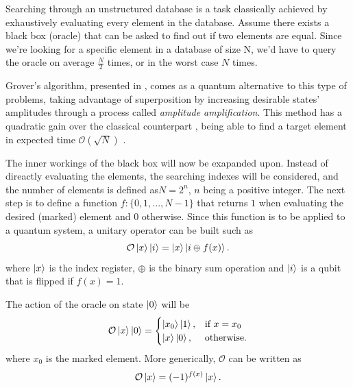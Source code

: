 \documentclass[../../dissertation.tex]{subfiles}
\begin{document}
Searching through an unstructured database is a task classically achieved by
exhaustively evaluating every element in the database. Assume there exists a
black box (oracle) that can be asked to find out if two elements are equal.
Since we're looking for a specific element in a database of size N, we'd have
to query the oracle on average $\frac{N}{2}$ times, or in the worst case $N$
times.\par 

Grover's algorithm, presented in \cite{grover1996}, comes as a
quantum alternative to this type of problems, taking advantage of superposition
by increasing desirable states' amplitudes through a process called
\textit{amplitude amplification}. This method has a quadratic gain over the
classical counterpart \cite{boyer1996}, being able to find a target element in
expected time $\mathcal{O}(\sqrt{N})$ .\par

The inner workings of the black box will now be exapanded upon. Instead of
direactly evaluating the elements, the searching indexes will be considered,
and the number of elements is defined as$N=2^{n}$, $n$ being a positive
integer. The next step is to define a function $f : \{0,1,...,N-1\}$ that
returns $1$ when evaluating the desired (marked) element and $0$ otherwise.
Since this function is to be applied to a quantum system, a unitary operator
can be built such as 
\begin{equation}
	\mathcal{O}\ket{x}\ket{i} = \ket{x}\ket{i\oplus f(x)} .
\end{equation}
where $\ket{x}$ is the index register, $\oplus$ is the binary sum operation and
$\ket{i}$ is a qubit that is flipped if $f(x)=1$.\par 

The action of the oracle on state $\ket{0}$ will be
\begin{equation}
	\mathcal{O}\ket{x}\ket{0} = \begin{cases} \ket{x_0}\ket{1}, & \mbox{if } x = x_0 \\ \ket{x}\ket{0}, & \mbox{otherwise.} \end{cases}
\end{equation}
where $x_0$ is the marked element. More generically, $\mathcal{O}$ can be
written as 
\begin{equation}
	\mathcal{O}\ket{x} = (-1)^{f(x)}\ket{x} .
\end{equation}\par
\end{document}

